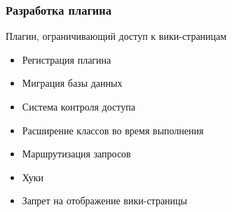 \documentclass[unicode]{beamer}
\begin{document}

\begin{frame}
\transwipe[direction=90]
\frametitle{Разработка плагина}
\begin{block}{Плагин, ограничивающий доступ к вики-страницам}
\begin{itemize}
  \item Регистрация плагина
  \item Миграция базы данных
  \item Система контроля доступа
  \item Расширение классов во время выполнения
  \item Маршрутизация запросов
  \item Хуки
  \item Запрет на отображение вики-страницы
\end{itemize}
\end{block}
\end{frame}
\end{document}
